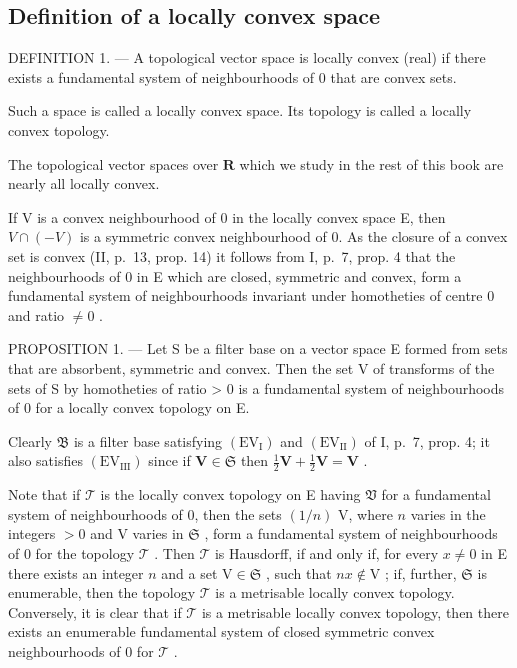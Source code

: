 \subsection{Definition of a locally convex space}

DEFINITION 1. --- A topological vector space is locally convex (real) if there exists a fundamental system of neighbourhoods of 0 that are convex sets.

Such a space is called a locally convex space. Its topology is called a locally convex topology.

The topological vector spaces over \(\mathbf{R}\) which we study in the rest of this book are nearly all locally convex.

If V is a convex neighbourhood of 0 in the locally convex space E, then \(V \cap (-V)\) is a symmetric convex neighbourhood of 0. As the closure of a convex set is convex (II, p.~13, prop. 14) it follows from I, p.~7, prop. 4 that the neighbourhoods of 0 in E which are closed, symmetric and convex, form a fundamental system of neighbourhoods invariant under homotheties of centre 0 and ratio \(\neq 0\) .

PROPOSITION 1. --- Let S be a filter base on a vector space E formed from sets that are absorbent, symmetric and convex. Then the set V of transforms of the sets of S by homotheties of ratio \textgreater{} 0 is a fundamental system of neighbourhoods of 0 for a locally convex topology on E.

Clearly \(\mathfrak{B}\) is a filter base satisfying \((\mathrm{EV}_{\mathrm{I}})\) and \((\mathrm{EV}_{\mathrm{II}})\) of I, p.~7, prop. 4; it also satisfies \((\mathrm{EV}_{\mathrm{III}})\) since if \(\mathbf{V} \in \mathfrak{S}\) then \(\frac{1}{2}\mathbf{V} + \frac{1}{2}\mathbf{V} = \mathbf{V}\) .

Note that if \(\mathcal{T}\) is the locally convex topology on E having \(\mathfrak{V}\) for a fundamental system of neighbourhoods of 0, then the sets \((1/n)\) V, where \(n\) varies in the integers \(>0\) and V varies in \(\mathfrak{S}\) , form a fundamental system of neighbourhoods of 0 for the topology \(\mathcal{T}\) . Then \(\mathcal{T}\) is Hausdorff, if and only if, for every \(x \neq 0\) in E there exists an integer \(n\) and a set \(\mathrm{V} \in \mathfrak{S}\) , such that \(nx \notin \mathrm{V}\) ; if, further, \(\mathfrak{S}\) is enumerable, then the topology \(\mathcal{T}\) is a metrisable locally convex topology. Conversely, it is clear that if \(\mathcal{T}\) is a metrisable locally convex topology, then there exists an enumerable fundamental system of closed symmetric convex neighbourhoods of 0 for \(\mathcal{T}\) .

